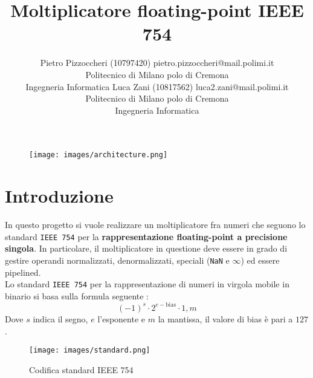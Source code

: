 \documentclass[twoside,11pt]{article}
\begin{document}
\title{Moltiplicatore floating-point IEEE 754}

\author{\name Pietro Pizzoccheri (10797420) \email pietro.pizzoccheri@mail.polimi.it \\
    \addr Politecnico di Milano polo di Cremona\\
    Ingegneria Informatica
    \AND
    \name Luca Zani (10817562) \email luca2.zani@mail.polimi.it \\
    \addr Politecnico di Milano polo di Cremona\\
    Ingegneria Informatica}


\maketitle

\begin{figure}[h!]
    \centering
    \texttt{[image: images/architecture.png]}
\end{figure}

\tableofcontents

\newpage

\section{Introduzione}
In questo progetto si vuole realizzare un moltiplicatore fra numeri che seguono lo standard \verb|IEEE 754| per la \textbf{rappresentazione floating-point a precisione singola}.
In particolare, il moltiplicatore in questione deve essere in grado di gestire operandi normalizzati, denormalizzati, speciali (\verb|NaN| e $\infty$) ed essere pipelined.\\
Lo standard \verb|IEEE 754| per la rappresentazione di numeri in virgola mobile in binario si basa sulla formula seguente :
\begin{equation*}
    (-1)^s \cdot 2^{e-\text{bias}} \cdot 1,m
\end{equation*}
Dove $s$ indica il segno, $e$ l’esponente e $m$ la mantissa, il valore di bias è pari a $127$.

\begin{figure}[h!]
    \centering
    \texttt{[image: images/standard.png]}
    \caption{Codifica standard IEEE 754}
    \label{fig:enter-label}
\end{figure}
\end{document}
